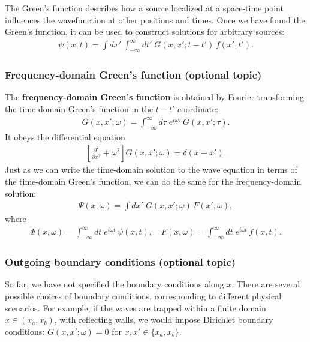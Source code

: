 \documentclass[10pt,a4paper]{article}
\begin{document}
The Green's function describes how a source localized at a space-time
point influences the wavefunction at other positions and times. Once
we have found the Green's function, it can be used to construct
solutions for arbitrary sources:
\begin{align}
  \psi(x,t) = \int dx' \,\int_{-\infty}^\infty dt'\; G(x,x';t-t') \, f(x', t').
\end{align}

\subsubsection{Frequency-domain Green's function (optional topic)}
\label{frequency-domain-greens-function}

The \textbf{frequency-domain Green's function} is obtained by Fourier
transforming the time-domain Green's function in the $t-t'$
coordinate:
\begin{align}
  G(x,x';\omega) = \int_{-\infty}^\infty d\tau\; e^{i\omega \tau}\, G(x,x'; \tau).
\end{align}
It obeys the differential equation
\begin{align}
  \left[\frac{\partial^2}{\partial x^2} + \omega^2 \right] G(x,x';\omega) = \delta(x-x').
\end{align}
Just as we can write the time-domain solution to the wave equation in
terms of the time-domain Green's function, we can do the same for the
frequency-domain solution:
\begin{align}
  \Psi(x,\omega) = \int dx' \; G(x,x';\omega) \, F(x', \omega),
\end{align}
where
\begin{align}
  \Psi(x,\omega) = \int_{-\infty}^\infty dt \; e^{i\omega t} \, \psi(x,t), \quad F(x,\omega) = \int_{-\infty}^\infty dt \; e^{i\omega t} \, f(x,t).
\end{align}

\subsubsection{Outgoing boundary conditions (optional topic)}
\label{outgoing-boundary-conditions}

So far, we have not specified the boundary conditions along $x$. There
are several possible choices of boundary conditions, corresponding to
different physical scenarios.  For example, if the waves are trapped
within a finite domain $x \in (x_a,x_b)$, with reflecting walls, we
would impose Dirichlet boundary conditions: $G(x,x';\omega) = 0$ for
$x,x' \in \{ x_a, x_b\}$.
\end{document}
